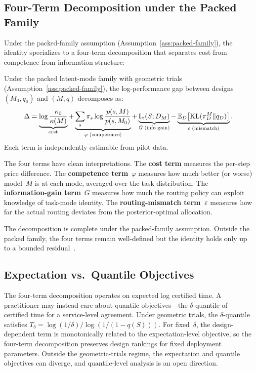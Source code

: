 \subsection{Four-Term Decomposition under the Packed Family}
\label{sec:four-term}

Under the packed-family assumption (Assumption~\ref{ass:packed-family}), the identity specializes to a four-term decomposition that separates cost from competence from information structure:

\begin{theorem}
\label{thm:four-term}
Under the packed latent-mode family with geometric trials (Assumption~\ref{ass:packed-family}), the log-performance gap between designs $(M_0, q_0)$ and $(M, q)$ decomposes as:
\begin{equation}
\label{eq:four-term}
  \Delta = \underbrace{\log\frac{\kappa_0}{\kappa(M)}}_{\text{cost}}
  + \underbrace{\sum_s \pi_s \log\frac{p(s, M)}{p(s, M_0)}}_{\varphi\;\text{(competence)}}
  + \underbrace{\mathrm{I}_\pi(S; D_M)}_{G\;\text{(info gain)}}
  - \underbrace{\mathbb{E}_D\bigl[\mathrm{KL}(\pi_D^M \| q_D)\bigr]}_{\varepsilon\;\text{(mismatch)}}.
\end{equation}
Each term is independently estimable from pilot data.
\end{theorem}

The four terms have clean interpretations.
The \textbf{cost term} measures the per-step price difference.
The \textbf{competence term}~$\varphi$ measures how much better (or worse) model~$M$ is at each mode, averaged over the task distribution.
The \textbf{information-gain term}~$G$ measures how much the routing policy can exploit knowledge of task-mode identity.
The \textbf{routing-mismatch term}~$\varepsilon$ measures how far the actual routing deviates from the posterior-optimal allocation.

The decomposition is complete under the packed-family assumption.
Outside the packed family, the four terms remain well-defined but the identity holds only up to a bounded residual~\citep{beneventano2026framework}.

\subsection{Expectation vs.\ Quantile Objectives}
\label{sec:quantile-scoping}

\begin{remark}
\label{rem:quantile-scoping}
The four-term decomposition operates on expected log certified time.
A practitioner may instead care about quantile objectives---the $\delta$-quantile of certified time for a service-level agreement.
Under geometric trials, the $\delta$-quantile satisfies $T_\delta = \log(1/\delta) / \log(1/(1-q(S)))$.
For fixed~$\delta$, the design-dependent term is monotonically related to the expectation-level objective, so the four-term decomposition preserves design rankings for fixed deployment parameters.
Outside the geometric-trials regime, the expectation and quantile objectives can diverge, and quantile-level analysis is an open direction.
\end{remark}

